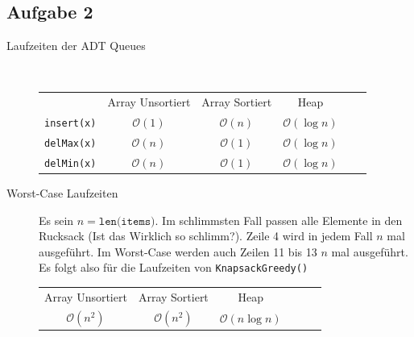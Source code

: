\documentclass[11pt]{article}
\begin{document}
\subsection*{Aufgabe 2}


\begin{description}
  \item[Laufzeiten der ADT Queues] $ $
    \begin{table}[h!]
      \centering
      \begin{tabular}{c c c c c c}
                             & Array Unsortiert & Array Sortiert   & Heap \\
          \texttt{insert(x)} & $\mathcal{O}(1)$ & $\mathcal{O}(n)$ & $\mathcal{O}(\log n)$ \\
          \texttt{delMax(x)} & $\mathcal{O}(n)$ & $\mathcal{O}(1)$ & $\mathcal{O}(\log n)$ \\
          \texttt{delMin(x)} & $\mathcal{O}(n)$ & $\mathcal{O}(1)$ & $\mathcal{O}(\log n)$ \\
         \end{tabular}
    \end{table}

  \item[Worst-Case Laufzeiten]
    Es sein $n = \texttt{len(items)}$.
    Im schlimmsten Fall passen alle Elemente in den Rucksack 
    (Ist das Wirklich so schlimm?). Zeile 4 wird in jedem Fall $n$ mal
    ausgeführt. Im Worst-Case werden auch Zeilen 11 bis 13 $n$ mal 
    ausgeführt. Es folgt also für die Laufzeiten von \texttt{KnapsackGreedy()}
    \begin{table}[h!]
      \centering
      \begin{tabular}{c c c c c c}
                             Array Unsortiert & Array Sortiert   & Heap \\
          
        $\mathcal{O}(n^2)$ & $\mathcal{O}(n^2)$ & $\mathcal{O}(n \log n)$ \\
      \end{tabular}
    \end{table}
    

  
\end{description}



  
\end{document}
